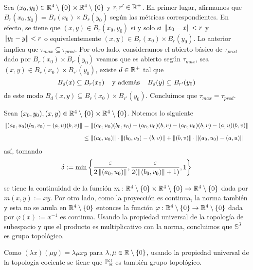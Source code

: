 \documentclass{article}
\begin{document}
\vspace{2mm}
\noindent Sea $(x_{0},y_{0})\in\mathbb{R}^{4}\setminus\{0\}\times\mathbb{R}^{4}\setminus\{0\}$ y $r,r'\in\mathbb{R}^{+}$. 
En primer lugar, afirmamos que $B_{r}(x_{0},y_{0})=B_{r}(x_{0})\times B_{r}(y_{0})$ según las 
métricas correspondientes. En efecto, se tiene que $(x,y)\in B_{r}(x_{0},y_{0})$ si y solo si 
$\left \lVert x_{0}-x\right \rVert<r$ y $\left \lVert y_{0}-y\right \rVert<r$ o equivalentemente $(x,y)\in B_{r}(x_{0})\times 
B_{r}(y_{0})$. Lo anterior implica que $\tau_{max}\subseteq\tau_{prod}$. Por otro lado, 
consideramos el abierto básico de $\tau_{prod}$ dado por $B_{r}(x_{0})\times B_{r'}(y_{0})$ veamos 
que es abierto según $\tau_{max}$, sea $(x,y)\in B_{r}(x_{0})\times B_{r'}(y_{0})$, existe 
$d\in\mathbb{R}^{+}$ tal que
\begin{equation*}
    B_{d}(x)\subseteq B_{r}(x_{0})
    \hspace{4mm}\text{y además}\hspace{4mm}
    B_{d}(y)\subseteq B_{r'}(y_{0})
\end{equation*}
de este modo $B_{d}(x,y)\subseteq B_{r}(x_{0})\times B_{r'}(y_{0})$. Concluimos que 
$\tau_{max}=\tau_{prod}$.

\vspace{2mm}
\noindent Sean $(x_{0},y_{0}),(x,y)\in\mathbb{R}^{4}\setminus\{0\}\times\mathbb{R}^{4}\setminus\{0\}$. Notemos lo 
siguiente
\begin{align*}
    \left \lVert (a_{0},u_{0})(b_{0},v_{0})-(a,u)(b,v)\right \rVert &= \left \lVert (a_{0},u_{0})(b_{0},v_{0})
    +(a_{0},u_{0})(b,v)-(a_{0},u_{0})(b,v)-(a,u)(b,v)\right \rVert \\[2mm]
    &\leq \left \lVert (a_{0},u_{0})\right \rVert\cdot\left \lVert (b_{0},v_{0})-(b,v)\right \rVert
    +\left \lVert (b,v)\right \rVert\cdot\left \lVert (a_{0},u_{0})-(a,u)\right \rVert
\end{align*}
así, tomando
\begin{equation*}
    \delta:=\min\left\{\frac{\varepsilon}{2\left \lVert (a_{0},u_{0})\right \rVert},
    \frac{\varepsilon}{2(\left \lVert (b_{0},v_{0})\right \rVert+1)},1\right\}
\end{equation*}

\vspace{2mm}
\noindent se tiene la continuidad de la función $m:\mathbb{R}^{4}\setminus\{0\}\times\mathbb{R}^{4}\setminus\{0\}
\to\mathbb{R}^{4}\setminus\{0\}$ dada por $m(x,y):=xy$. Por otro lado, como la proyección es continua, la
norma también y esta no se anula en $\mathbb{R}^{4}\setminus\{0\}$ entonces la función $\varphi:
\mathbb{R}^{4}\setminus\{0\}\to\mathbb{R}^{4}\setminus\{0\}$ dada por $\varphi(x):=x^{-1}$ es continua. Usando la
propiedad universal de la topología de subespacio y que el producto es multiplicativo con la 
norma, concluimos que $\mathbb{S}^{3}$ es grupo topológico.

\vspace{2mm}
\noindent Como $(\lambda x)(\mu y)=\lambda\mu xy$ para $\lambda,\mu\in\mathbb{R}\setminus\{0\}$, usando la
propiedad universal de la topología cociente se tiene que $\mathbb{P}_{\mathbb{R}}^{3}$ es también grupo 
topológico.

\end{document}
